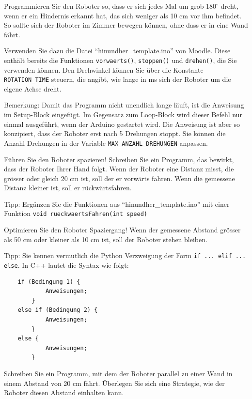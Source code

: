 \begin{myexercise}
    Programmieren Sie den Roboter so, dass er sich jedes Mal um grob \(180^\circ\) dreht, wenn er ein Hindernis erkannt hat, das sich weniger als 10 cm vor ihm befindet. So sollte sich der Roboter im Zimmer bewegen können, ohne dass er in eine Wand fährt.

    Verwenden Sie dazu die Datei \enquote{hinundher\_template.ino} von Moodle. Diese enthält bereits die Funktionen \lstinline|vorwaerts()|, \lstinline|stoppen()| und \lstinline|drehen()|, die Sie verwenden können. Den Drehwinkel können Sie über die Konstante \lstinline|ROTATION_TIME| steuern, die angibt, wie lange in \si{\milli\second} sich der Roboter um die eigene Achse dreht.

    Bemerkung: \newline
    Damit das Programm nicht unendlich lange läuft, ist die Anweisung im Setup-Block eingefügt. Im Gegensatz zum Loop-Block wird dieser Befehl nur einmal ausgeführt, wenn der Arduino gestartet wird. Die Anweisung ist aber so konzipiert, dass der Roboter erst nach 5 Drehungen stoppt. Sie können die Anzahl Drehungen in der Variable \lstinline|MAX_ANZAHL_DREHUNGEN| anpassen.

\end{myexercise}

\begin{myexercise}
    Führen Sie den Roboter spazieren!\newline
    Schreiben Sie ein Programm, das bewirkt, dass der Roboter Ihrer Hand folgt. Wenn der Roboter eine Distanz misst, die grösser oder gleich 20 \si{\centi\metre} ist, soll der er vorwärts fahren. Wenn die gemessene Distanz kleiner ist, soll er rückwärtsfahren.

    Tipp: Ergänzen Sie die Funktionen aus \enquote{hinundher\_template.ino} mit einer Funktion \lstinline|void rueckwaertsFahren(int speed)|
\end{myexercise}
\begin{myexercise}
    Optimieren Sie den Roboter Spaziergang! \newline
    Wenn der gemessene Abstand grösser als 50 \si{\centi\metre} oder kleiner als 10  \si{\centi\metre} ist, soll der Roboter stehen bleiben.

    Tipp: Sie kennen vermutlich die Python Verzweigung der Form \lstinline|if ... elif ... else|. In C++ lautet die Syntax wie folgt:
    \begin{lstlisting}
    if (Bedingung 1) {
            Anweisungen;
        }
    else if (Bedingung 2) {
            Anweisungen;
        }
    else {
            Anweisungen;
        }
     \end{lstlisting}

\end{myexercise}
\begin{myexercise}
    Schreiben Sie ein Programm, mit dem der Roboter parallel zu einer Wand in einem Abstand von  20 \si{\centi\metre} fährt. Überlegen Sie sich eine Strategie, wie der Roboter diesen Abstand einhalten kann.
\end{myexercise}

